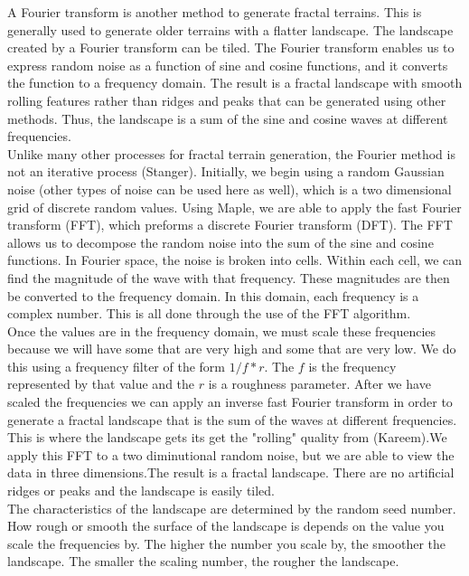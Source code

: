\documentclass{article}
\begin{document}
	\indent A Fourier transform is another method to generate fractal terrains. This is generally used to generate older terrains with a flatter landscape. The landscape created by a Fourier transform can be tiled. The Fourier transform enables us to express random noise as a function of sine and cosine functions, and it converts the function to a frequency domain. The result is a fractal landscape with smooth rolling features rather than ridges and peaks that can be generated using other methods. Thus, the landscape is a sum of the sine and cosine waves at different frequencies.	\\
	\indent Unlike many other processes for fractal terrain generation, the Fourier method is not an iterative process (Stanger). Initially, we begin using a random Gaussian noise (other types of noise can be used here as well), which is a two dimensional grid of discrete random values. Using Maple, we are able to apply the fast Fourier transform (FFT), which preforms a discrete Fourier transform (DFT). The FFT allows us to decompose the random noise into the sum of the sine and cosine functions. In Fourier space, the noise is broken into cells. Within each cell, we can find the magnitude of the wave with that frequency. These magnitudes are then be converted to the frequency domain. In this domain, each frequency is a complex number. This is all done through the use of the FFT algorithm. \\
	\indent Once the values are in the frequency domain, we must scale these frequencies because we will have some that are very high and some that are very low. We do this using a frequency filter of the form $1/f*r$. The $f$ is the frequency represented by that value and the $r$ is a roughness parameter. After we have scaled the frequencies we can apply an inverse fast Fourier transform in order to generate a fractal landscape that is the sum of the waves at different frequencies. This is where the landscape gets its get the "rolling" quality from (Kareem).We apply this FFT to a two diminutional random noise, but we are able to view the data in three dimensions.The result is a fractal landscape. There are no artificial ridges or peaks and the landscape is easily tiled.\\
	\indent   The characteristics of the landscape are determined by the random seed number. How rough or smooth the surface of the landscape is depends on the value you scale the frequencies by. The higher the number you scale by, the smoother the landscape. The smaller the scaling number, the rougher the landscape.
\end{document}
